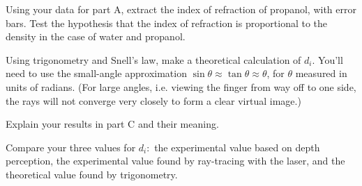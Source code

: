 \analysis

Using your data for part A, extract the index of refraction of propanol, with error bars.
Test the hypothesis that the index of refraction is proportional to the density
in the case of water and propanol.

Using trigonometry and Snell's law, make a theoretical
calculation of $d_i$. You'll need to use the small-angle
approximation $\sin  \theta \approx\tan \theta\approx\theta$, for $\theta $
measured in units of radians. (For large angles, i.e.
viewing the finger from way off to one side, the rays will
not converge very closely to form a clear virtual image.)

Explain your results in part C and their meaning.

Compare your three values for $d_i:$ the experimental value
based on depth perception, the experimental value found by
ray-tracing with the laser, and the theoretical value
found by trigonometry.
